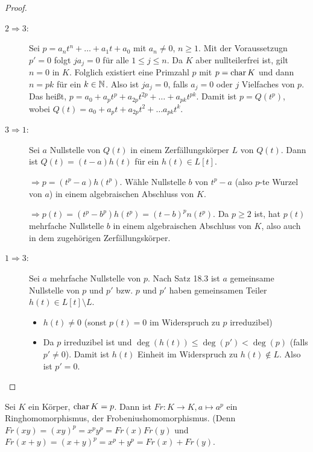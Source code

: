 \documentclass[12pt,a4paper]{scrartcl}
\begin{document}
\begin{proof}
	\leavevmode
	\begin{description}
		\item[$2\Rightarrow3$:] Sei $p = a_nt^n+\dots +a_1t+a_0$ mit $a_n \neq 0$, $n\geq 1$. Mit der Voraussetzugn $p' = 0$ folgt $ja_j = 0$ für alle $1\leq j\leq n$. Da $K$ aber nullteilerfrei ist, gilt $n = 0$ in $K$. Folglich existiert eine Primzahl $p$ mit $p = \operatorname{char} K$ und dann $n = pk$ für ein $k\in\mathbb N$. Also ist $ja_j = 0$, falls $a_j = 0$ oder $j$ Vielfaches von $p$. Das heißt, $p = a_0+a_pt^p+a_{2p}t^{2p}+\dots+a_{pk}t^{pk}$. Damit ist $p = Q(t^p)$, wobei $Q(t)= a_0+a_pt+a_{2p}t^2+\dots a_{pk}t^k$.
		\item[$3\Rightarrow1$:] Sei $a$ Nullstelle von $Q(t)$ in einem Zerfällungskörper $L$ von $Q(t)$. Dann ist $Q(t) = (t-a)h(t)$ für ein $h(t)\in L[t]$. 
		
		$\Rightarrow p = (t^p-a)h(t^p)$. Wähle Nullstelle $b$ von $t^p-a$ (also $p$-te Wurzel von $a$) in einem algebraischen Abschluss von $K$. 
		
		$\Rightarrow p(t) = (t^p-b^p)h(t^p) = (t-b)^pn(t^p)$. Da $p\geq 2$ ist, hat $p(t)$ mehrfache Nullstelle $b$ in einem algebraischen Abschluss von $K$, also auch in dem zugehörigen Zerfällungskörper.
		\item[$1\Rightarrow3$:] Sei $a$ mehrfache Nullstelle von $p$. Nach Satz 18.3 ist $a$ gemeinsame  Nullstelle von $p$ und $p'$ bzw. $p$ und $p'$ haben gemeinsamen Teiler $h(t)\in L[t]\setminus L$.
		\begin{itemize}
			\item $h(t)\neq 0$ (sonst $p(t) = 0$ im Widerspruch zu $p$ irreduzibel)
			\item Da $p$ irreduzibel ist und $\deg(h(t)) \leq \deg(p')<\deg(p)$ (falls $p' \neq 0$). Damit ist $h(t)$ Einheit im Widerspruch zu $h(t) \notin L$. Also ist $p' = 0$.
		\end{itemize}
	\end{description}
\end{proof}

\begin{defi}
	Sei $K$ ein Körper, $\operatorname{char} K = p$. Dann ist $Fr\colon K\to K, a\mapsto a^p$ ein Ringhomomorphismus, der Frobeniushomomorphismus. (Denn $Fr(xy) = (xy)^p = x^py^p = Fr(x)Fr(y)$ und $Fr(x+y) = (x+y)^p = x^p+y^p = Fr(x) + Fr(y)$.
\end{defi}


\end{document}
